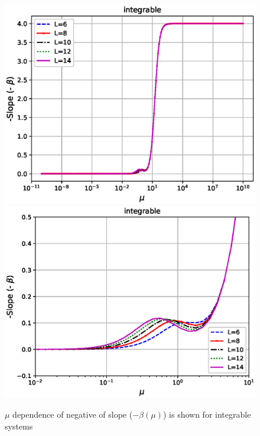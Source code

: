 \documentclass[11pt,a4paper]{article}
\begin{document}
\begin{figure}[ht!]
\begin{center}
\includegraphics[scale=0.5]{new_pics/v3_slope_int_semilogx.eps} 
\includegraphics[scale=0.5]{new_pics/v3_slope_int_semilogx_zoom.eps}
\caption{$\mu$ dependence of negative of slope ($-\beta (\mu)$) is shown for  integrable systems }
\label{slope_integrable_mu}
\end{center}
\end{figure}

 


%
\end{document}
